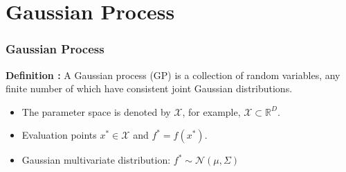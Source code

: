 \section{Gaussian Process }
\begin{frame}    \frametitle{Gaussian Process \cite{quinnonero2007approximation}}
    \textbf{Definition :} A Gaussian process (GP) is a collection of random variables, any finite number of which have consistent joint Gaussian distributions. \\
    \begin{itemize}
        \item The parameter space is denoted by \( \mathcal{X} \), for example, \( \mathcal{X} \subset \mathbb{R}^D \).
        \item Evaluation points \( x^* \in \mathcal{X} \) and  \( f^* = f(x^*) \).
        \item Gaussian multivariate distribution: \(f^* \sim \mathcal{N}(\mu, \Sigma)\)
    \end{itemize}
     

    
   
    \begin{figure}[!tbp]
        \centering
        \subfloat{\label{fig:f1}}
        \centering
        \subfloat{\label{fig:f1}}
        \hfill
        \subfloat{\label{fig:f2}}
    \end{figure}
    
\end{frame}	


